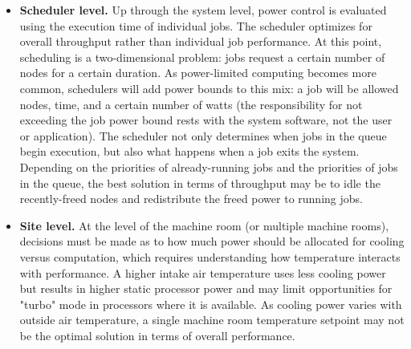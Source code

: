 \begin{itemize}
\item \textbf{Scheduler level.}  Up through the system level, power control is evaluated
using the execution time of individual jobs.  The scheduler optimizes for overall throughput
rather than individual job performance.  At this point, scheduling is a two-dimensional 
problem:  jobs request a certain number of nodes for a certain duration.  As power-limited
computing becomes more common, schedulers will add power bounds to this mix:  a job will
be allowed nodes, time, and a certain number of watts (the responsibility for not exceeding
the job power bound rests with the system software, not the user or application).  The 
scheduler not only determines when jobs in the queue begin execution, but also what happens
when a job exits the system.  Depending on the priorities of already-running jobs and the
priorities of jobs in the queue, the best solution in terms of throughput may be to idle
the recently-freed nodes and redistribute the freed power to running jobs.

\item \textbf{Site level.}  At the level of the machine room (or multiple machine rooms),
decisions must be made as to how much power should be allocated for cooling versus computation,
which requires understanding how temperature interacts with performance.  A higher intake
air temperature uses less cooling power but results in higher static processor power and 
may limit opportunities for "turbo" mode in processors where it is available.  As cooling
power varies with outside air temperature, a single machine room temperature setpoint may 
not be the optimal solution in terms of overall performance.  

\end{itemize}

